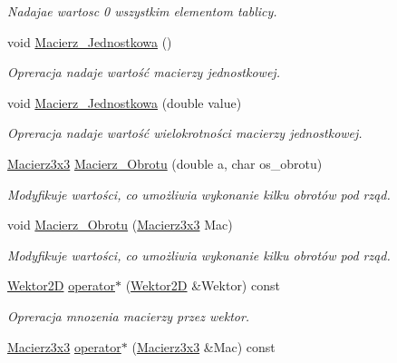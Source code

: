 \begin{DoxyCompactItemize}
\begin{DoxyCompactList}\small\item\em Nadajae wartosc 0 wszystkim elementom tablicy. \end{DoxyCompactList}\item 
\hypertarget{class_macierz3x3_a1124bb1bdaa8f4290583b5fd36e94fa8}{void \hyperlink{class_macierz3x3_a1124bb1bdaa8f4290583b5fd36e94fa8}{Macierz\+\_\+\+Jednostkowa} ()}\label{class_macierz3x3_a1124bb1bdaa8f4290583b5fd36e94fa8}

\begin{DoxyCompactList}\small\item\em Opreracja nadaje wartość macierzy jednostkowej. \end{DoxyCompactList}\item 
void \hyperlink{class_macierz3x3_a58cf5aad7a3743f92967a4ccfaf1fd38}{Macierz\+\_\+\+Jednostkowa} (double value)
\begin{DoxyCompactList}\small\item\em Opreracja nadaje wartość wielokrotności macierzy jednostkowej. \end{DoxyCompactList}\item 
\hyperlink{class_macierz3x3}{Macierz3x3} \hyperlink{class_macierz3x3_aeb18624a669e02c1e577fc08396ddf96}{Macierz\+\_\+\+Obrotu} (double a, char os\+\_\+obrotu)
\begin{DoxyCompactList}\small\item\em Modyfikuje wartości, co umożliwia wykonanie kilku obrotów pod rząd. \end{DoxyCompactList}\item 
void \hyperlink{class_macierz3x3_a00ff4bdc245653c88d1d0f9b3c54c011}{Macierz\+\_\+\+Obrotu} (\hyperlink{class_macierz3x3}{Macierz3x3} Mac)
\begin{DoxyCompactList}\small\item\em Modyfikuje wartości, co umożliwia wykonanie kilku obrotów pod rząd. \end{DoxyCompactList}\item 
\hypertarget{class_macierz3x3_a8a08cd6ab09ca69317dbb69573968929}{\hyperlink{class_wektor2_d}{Wektor2\+D} \hyperlink{class_macierz3x3_a8a08cd6ab09ca69317dbb69573968929}{operator$\ast$} (\hyperlink{class_wektor2_d}{Wektor2\+D} \&Wektor) const }\label{class_macierz3x3_a8a08cd6ab09ca69317dbb69573968929}

\begin{DoxyCompactList}\small\item\em Opreracja mnozenia macierzy przez wektor. \end{DoxyCompactList}\item 
\hypertarget{class_macierz3x3_acb6935027b981784dc16607c36d66a77}{\hyperlink{class_macierz3x3}{Macierz3x3} \hyperlink{class_macierz3x3_acb6935027b981784dc16607c36d66a77}{operator$\ast$} (\hyperlink{class_macierz3x3}{Macierz3x3} \&Mac) const }\label{class_macierz3x3_acb6935027b981784dc16607c36d66a77}


\end{DoxyCompactItemize}
